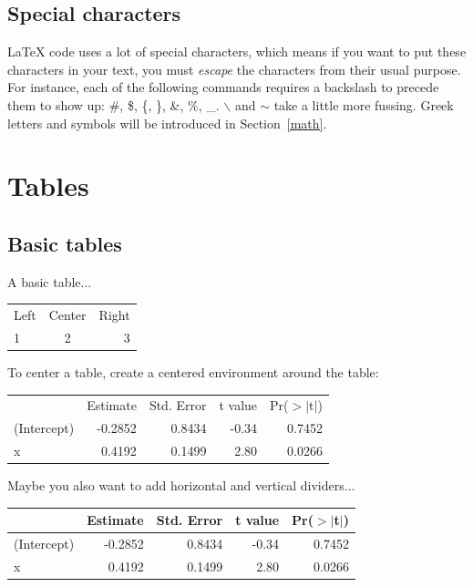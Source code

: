 \documentclass[11pt]{article} %
\begin{document}
\subsection{Special characters}

LaTeX code uses a lot of special characters, which means if you want to put these characters in your text, you must \emph{escape} the characters from their usual purpose. For instance, each of the following commands requires a backslash to precede them to show up: \#, \$, \{, \}, \&, \%, \_. $\backslash$ and $\sim$ take a little more fussing. Greek letters and symbols will be introduced in Section~\ref{math}.

\section{Tables}

\subsection{Basic tables}

A basic table... \\

\begin{tabular}{l c r} %
	Left & Center & Right \\ %
	1     & 2           & 3  \\
\end{tabular}

To center a table, create a centered environment around the table:
\begin{center}
\begin{tabular}{lrrrr}
 		           & Estimate & Std. Error & t value & Pr($>$$|$t$|$) \\
(Intercept) & -0.2852   & 0.8434     & -0.34    & 0.7452 \\
x                & 0.4192    & 0.1499     & 2.80     & 0.0266 \\
\end{tabular}
\end{center}

Maybe you also want to add horizontal and vertical dividers...

\begin{center}
\begin{tabular}{l | rrrr}
  \hline
   \hline
 & Estimate & Std. Error & t value & Pr($>$$|$t$|$) \\
  \hline
(Intercept) & -0.2852 & 0.8434 & -0.34 & 0.7452 \\
  x & 0.4192 & 0.1499 & 2.80 & 0.0266 \\
   \hline
   \hline
\end{tabular}
\end{center}
\end{document}
